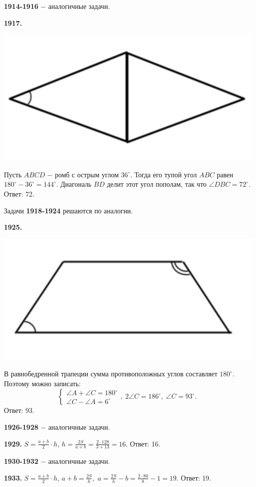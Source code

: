 \textbf{1914-1916} $-$ аналогичные задачи.

\textbf{1917.}

{\centering \includegraphics[width=0.4\linewidth]{Geometry/Content/26.png}
	
}

Пусть $ABCD$ $-$ ромб с острым углом $36^\circ$. Тогда его тупой угол $ABC$ равен $180^\circ - 36^\circ = 144^\circ$. Диагональ $BD$ делит этот угол пополам, так что $\angle DBC = 72^\circ.$ \newline \null \hspace*{\fill} Ответ: 72.

Задачи \textbf{1918-1924} решаются по аналогии. 

\textbf{1925.}

{\centering \includegraphics[width=0.5\linewidth]{Geometry/Content/27.png}
	
}

В равнобедренной трапеции сумма противоположных углов составляет $180^\circ$. Поэтому можно записать:
\[
\begin{cases}
	\angle A + \angle C = 180^\circ \\
	\angle C - \angle A = 6^\circ \end{cases}
, \; 2\angle C = 186^\circ, \; \angle C = 93^\circ.\;
\]\null \hspace*{\fill} Ответ: 93.

\textbf{1926-1928} $-$ аналогичные задачи.

\textbf{1929.} $S = \frac{a + b}{2}\cdot h$, $h = \frac{2S}{a + b} = \frac{2\cdot 128}{3 + 13} = 16.$ \newline \null \hspace*{\fill} Ответ: 16.

\textbf{1930-1932} $-$ аналогичные задачи.

\textbf{1933.} $S = \frac{a + b}{2}\cdot h$, $a + b = \frac{2S}{h},$ $a = \frac{2S}{h} - b = \frac{2\cdot 80}{8} - 1 = 19.$ \newline \null \hspace*{\fill} Ответ: 19.


